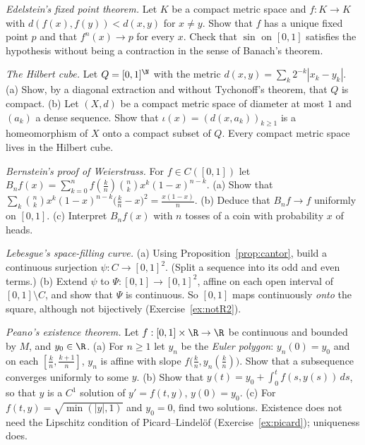\begin{exercise}[$\star\star$]\label{ex:edelstein}
\emph{Edelstein's fixed point theorem.} Let $K$ be a compact metric space and $f:K\to K$ with $d(f(x),f(y))<d(x,y)$ for $x\ne y$. Show that $f$ has a unique fixed point $p$
and that $f^n(x)\to p$ for every $x$. Check that $\sin$ on $[0,1]$ satisfies the hypothesis without being a contraction in the sense of Banach's theorem.
\end{exercise}

\begin{exercise}[$\star\star$]\label{ex:hilbertcube}
\emph{The Hilbert cube.} Let $Q=[0,1]^\N$ with the metric $d(x,y)=\sum_k2^{-k}|x_k-y_k|$. (a) Show, by a diagonal extraction and without Tychonoff's theorem, that $Q$ is
compact. (b) Let $(X,d)$ be a compact metric space of diameter at most $1$ and $(a_k)$ a dense sequence. Show that $\iota(x)=(d(x,a_k))_{k\ge1}$ is a homeomorphism of $X$ onto a
compact subset of $Q$. Every compact metric space lives in the Hilbert cube.
\end{exercise}

\begin{exercise}[$\star\star$]\label{ex:bernstein}
\emph{Bernstein's proof of Weierstrass.} For $f\in C([0,1])$ let $B_nf(x)=\sum_{k=0}^nf(\frac kn)\binom nkx^k(1-x)^{n-k}$. (a) Show that $\sum_k\binom nkx^k(1-x)^{n-k}\bigl(\frac kn-x\bigr)^2=\frac{x(1-x)}n$.
(b) Deduce that $B_nf\to f$ uniformly on $[0,1]$. (c) Interpret $B_nf(x)$ with $n$ tosses of a coin with probability $x$ of heads.
\end{exercise}

\begin{exercise}[$\star\star$]\label{ex:lebesguecurve}
\emph{Lebesgue's space-filling curve.} (a) Using Proposition~\ref{prop:cantor}, build a continuous surjection $\psi:C\to[0,1]^2$. (Split a sequence into its odd and even terms.)
(b) Extend $\psi$ to $\Psi:[0,1]\to[0,1]^2$, affine on each open interval of $[0,1]\setminus C$, and show that $\Psi$ is continuous. So $[0,1]$ maps continuously \emph{onto} the square, although
not bijectively (Exercise~\ref{ex:notR2}).
\end{exercise}

\begin{exercise}[$\star\star\star$]\label{ex:peano}
\emph{Peano's existence theorem.} Let $f:[0,1]\times\R\to\R$ be continuous and bounded by $M$, and $y_0\in\R$. (a) For $n\ge1$ let $y_n$ be the \emph{Euler polygon}: $y_n(0)=y_0$ and
on each $[\frac kn,\frac{k+1}n]$, $y_n$ is affine with slope $f\bigl(\frac kn,y_n(\frac kn)\bigr)$. Show that a subsequence converges uniformly to some $y$. (b) Show that
$y(t)=y_0+\int_0^tf(s,y(s))\,ds$, so that $y$ is a $C^1$ solution of $y'=f(t,y)$, $y(0)=y_0$. (c) For $f(t,y)=\sqrt{\min(|y|,1)}$ and $y_0=0$, find two solutions. Existence does not need
the Lipschitz condition of Picard--Lindel\"of (Exercise~\ref{ex:picard}); uniqueness does.
\end{exercise}

